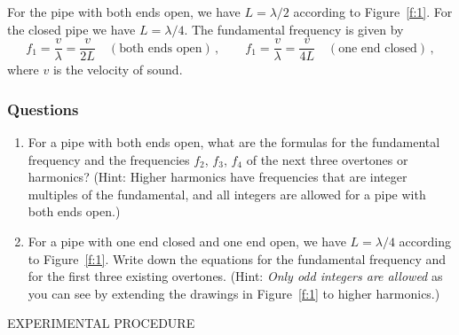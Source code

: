 \documentclass[11pt]{NSF}
\def\be{\begin{equation}}
\def\ee{\end{equation}}
\def\ben{\begin{enumerate}}
\def\een{\end{enumerate}}
\def\i{\item{}}
\begin{document}
For the pipe with both ends open, we have $L = \lambda/2$ according to 
Figure~\ref{f:1}. 
For the closed pipe we have $L = \lambda/4$. 
The fundamental frequency is given by
%
\be
f_1 = \frac{v}{\lambda} = \frac{v}{2L}
\quad(\text{both ends open})\,,
\qquad
f_1 = \frac{v}{\lambda} = \frac{v}{4L} 
\quad(\text{one end closed})\,,
\ee
%
where $v$ is the velocity of sound.

\subsubsection*{Questions}
\ben
\i For a pipe with both ends open, what are the formulas for the fundamental
frequency and the frequencies $f_2$, $f_3$, $f_4$ of the next three overtones or harmonics?
(Hint: Higher harmonics have frequencies that are integer multiples of the
fundamental, and all integers are allowed for a pipe with both ends open.)

\i
For a pipe with one end closed and one end open, we have $L = \lambda/4$ 
according to Figure~\ref{f:1}. 
Write down the equations for the fundamental frequency and for the
first three existing overtones. 
(Hint: {\em Only odd integers are allowed} as you can see by extending 
the drawings in Figure~\ref{f:1} to higher harmonics.)

\een

EXPERIMENTAL PROCEDURE
\end{document}

